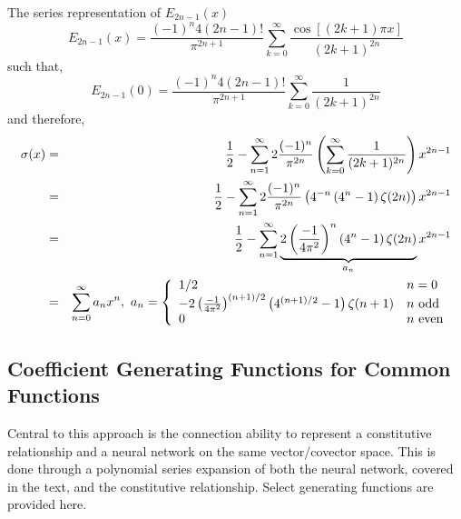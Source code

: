 The series representation of $E_{2n-1}(x)$
\begin{equation}
	E_{2n-1}(x) = \frac{(-1)^n 4 (2n - 1)!}{\pi^{2n+1}} \sum_{k=0}^\infty \frac{\cos [(2k + 1) \pi x]}{(2k + 1)^{2n}}
\end{equation}
such that,
\begin{equation}
	E_{2n-1}(0) = \frac{(-1)^n 4 (2n - 1)!}{\pi^{2n+1}} \sum_{k=0}^\infty \frac{1}{(2k + 1)^{2n}}
\end{equation}
and therefore,
\begin{eqnarray}
	\sigma(x) & = & \frac{1}{2} - \sum_{n=1}^\infty 2 \frac{(-1)^n}{\pi^{2n}} \left( \sum_{k=0}^\infty \frac{1}{(2k+1)^{2n}} \right) x^{2n-1} \\
		& = & \frac{1}{2} - \sum_{n=1}^\infty 2 \frac{(-1)^n}{\pi^{2n}} \left( 4^{-n} \left( 4^n - 1 \right) \zeta(2n) \right) x^{2n-1} \nonumber \\
		& = & \frac{1}{2} - \sum_{n=1}^\infty \underbrace{2 \left( \frac{-1}{4\pi^2} \right)^n \left( 4^n - 1 \right) \zeta(2n)}_{a_n} x^{2n-1} \nonumber \\
		& = & \sum_{n=0}^\infty a_n x^n,\ a_n = \left\{ \begin{array}{l l}
			1/2	& n = 0 \\
			-2 \left( \frac{-1}{4\pi^2} \right)^{(n+1)/2} \left( 4^{(n+1)/2} - 1 \right)\zeta(n+1)	& n\ \text{odd} \\
			0	& n\ \text{even}
		\end{array}\right.
		\label{eqn:sigmoid zeta expansion}
\end{eqnarray}

\subsection{Coefficient Generating Functions for Common Functions}

Central to this approach is the connection ability to represent a constitutive relationship and a neural network on the same vector/covector space. This is done through a polynomial series expansion of both the neural network, covered in the text, and the constitutive relationship. Select generating functions are provided here.

